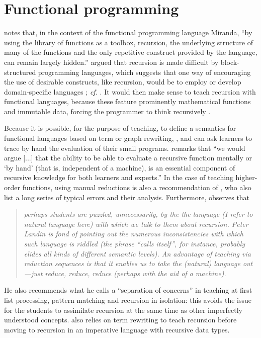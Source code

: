 \documentclass[11pt,a4paper]{article}
\newcommand\plang[1]{\textsf{#1}\xspace}
\begin{document}
\section{Functional programming}

\textcite{Segal:1994} notes that, in the context of the functional
programming language \plang{Miranda}, ``by using the library of
functions as a toolbox, recursion, the underlying structure of many of
the functions and the only repetitive construct provided by the
language, can remain largely hidden.'' \textcite{Er:1984} argued that
recursion is made difficult by block\hyp{}structured programming
languages, which suggests that one way of encouraging the use of
desirable constructs, like recursion, would be to employ or develop
domain\hyp{}specific languages \citep{SinhaVessey:1992}; \emph{cf.}\@
\textcite{BrooksMillerRoperWood:1992}. It would then make sense to
teach recursion with functional languages, because these feature
prominently mathematical functions and immutable data, forcing the
programmer to think recursively
\citep{HendersonRomero:1989,Howland:1998}.

Because it is possible, for the purpose of teaching, to define a
semantics for functional languages based on term or graph rewriting,
\textcite{Velazquez:1999}, \textcite{ParejaUrquizaVelazquez:2007} and
\textcite{Rinderknecht:2012} can ask learners to trace by hand the
evaluation of their small programs. \textcite{Segal:1994} remarks that
``we would argue [...] that the ability to be able to evaluate a
recursive function mentally or `by hand' (that is, independent of a
machine), is an essential component of recursive knowledge for both
learners and experts.'' In the case of teaching higher\hyp{}order
functions, using manual reductions is also a recommendation of
\textcite{ClackMyers:1995}, who also list a long series of typical
errors and their analysis. Furthermore, \textcite{Burton:1995}
observes that
\begin{quote}
\it perhaps students are puzzled, unnecessarily, by the the language
(I refer to natural language here) with which we talk to them about
recursion. Peter Landin is fond of pointing out the numerous
inconsistencies with which such language is riddled (the phrase
``calls itself'', for instance, probably elides all kinds of different
semantic levels). An advantage of teaching via reduction sequences is
that it enables us to take the (natural) language out---just reduce,
reduce, reduce (perhaps with the aid of a machine).
\end{quote}
He also recommends what he calls a ``separation of concerns'' in
teaching at first list processing, pattern matching and recursion in
isolation: this avoids the issue for the students to assimilate
recursion at the same time as other imperfectly understood
concepts. \textcite{Velazquez:1999} also relies on term rewriting to
teach recursion before moving to recursion in an imperative language
with recursive data types.
\end{document}

